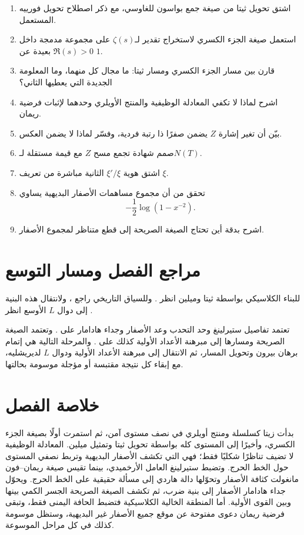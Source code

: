 \begin{enumerate}
  \item اشتق تحويل ثيتا من صيغة جمع بواسون للغاوسي، مع ذكر اصطلاح تحويل
  فورييه المستعمل.
  \item استعمل صيغة الجزء الكسري لاستخراج تقدير لـ\(\zeta(s)\) على
  مجموعة مدمجة داخل \(\Re(s)>0\) بعيدة عن \(1\).
  \item قارن بين مسار الجزء الكسري ومسار ثيتا: ما مجال كل منهما، وما
  المعلومة الجديدة التي يعطيها الثاني؟
  \item اشرح لماذا لا تكفي المعادلة الوظيفية والمنتج الأويلري وحدهما
  لإثبات فرضية ريمان.
  \item بيّن أن تغير إشارة \(Z\) يضمن صفرًا ذا رتبة فردية، وفسّر لماذا
  لا يضمن العكس.
  \item صمم شهادة تجمع مسح \(Z\) مع قيمة مستقلة لـ\(N(T)\).
  \item اشتق هوية \(\xi'/\xi\) الثانية مباشرة من تعريف \(\xi\).
  \item تحقق من أن مجموع مساهمات الأصفار البديهية يساوي
  \[
  -\frac12\log(1-x^{-2}).
  \]
  \item اشرح بدقة أين تحتاج الصيغة الصريحة إلى قطع متناظر لمجموع
  الأصفار.
\end{enumerate}

\section{مراجع الفصل ومسار التوسع}

للبناء الكلاسيكي بواسطة ثيتا وميلين انظر
\cite{Apostol1976,Titchmarsh1986}. وللسياق التاريخي راجع
\cite{Riemann1859,Narkiewicz2000}، ولانتقال هذه البنية إلى دوال
\(L\) الأوسع انظر \cite{GelbartMiller2003,IwaniecKowalski2004}.

تعتمد تفاصيل ستيرلينغ وحد التحدب وعد الأصفار وجداء هادامار على
\cite{Titchmarsh1986,IwaniecKowalski2004}. وتعتمد الصيغة الصريحة ومسارها
إلى مبرهنة الأعداد الأولية كذلك على \cite{Davenport2000}. والمرحلة
التالية هي إتمام برهان بيرون وتحويل المسار، ثم الانتقال إلى مبرهنة
الأعداد الأولية ودوال \(L\) لديريشليه، مع إبقاء كل نتيجة مقتبسة أو
مؤجلة موسومة بحالتها.

\section{خلاصة الفصل}

بدأت زيتا كسلسلة ومنتج أويلري في نصف مستوى آمن، ثم استمرت أولًا بصيغة
الجزء الكسري، وأخيرًا إلى المستوى كله بواسطة تحويل ثيتا وتمثيل ميلين.
المعادلة الوظيفية لا تضيف تناظرًا شكليًا فقط؛ فهي التي تكشف الأصفار
البديهية وتربط نصفي المستوى حول الخط الحرج. وتضبط ستيرلينغ العامل
الأرخميدي، بينما تقيس صيغة ريمان--فون مانغولت كثافة الأصفار وتحوّلها
دالة هاردي إلى مسألة حقيقية على الخط الحرج. ويحوّل جداء هادامار الأصفار
إلى بنية ضرب، ثم تكشف الصيغة الصريحة الجسر الكمي بينها وبين القوى
الأولية. أما المنطقة الخالية الكلاسيكية فتضبط الحافة اليمنى فقط، وتبقى
فرضية ريمان دعوى مفتوحة عن موقع جميع الأصفار غير البديهية، وستظل موسومة
كذلك في كل مراحل الموسوعة.
